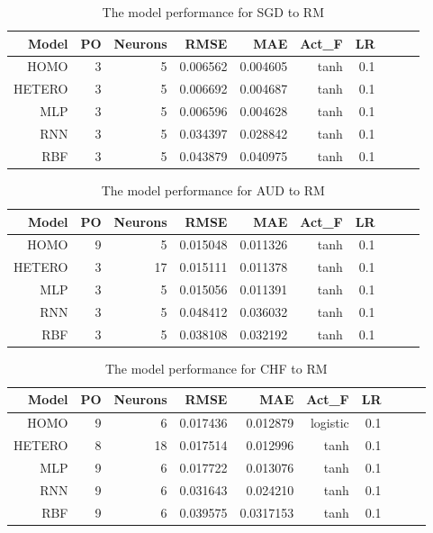 \documentclass[journal]{IEEEtran}
\begin{document}
\begin{table}[ht]
	\centering
	\begin{tabular}{@{}rrrrrrrrrr@{}}
		\toprule
		\textbf{Model} &\textbf{PO}&\textbf{Neurons}& \textbf{RMSE} & \textbf{MAE} & \textbf{Act\_F} & \textbf{LR} \\
		\midrule
		
		HOMO	&  3 & 5 & 0.006562 & 0.004605 & tanh & 0.1 \\
		HETERO	& 3 & 5 & 0.006692 & 0.004687 & tanh & 0.1  \\  
		MLP	&  3 & 5 & 0.006596 & 0.004628 & tanh & 0.1 \\	
		RNN	& 3 & 5 & 0.034397 & 0.028842 & tanh & 0.1 \\
		RBF	& 3 & 5 & 0.043879 & 0.040975 & tanh & 0.1  \\
		\hline
	\end{tabular}
	\hspace*{3cm}
	\caption{The model performance for SGD to RM }
\end{table}


\begin{table}[ht]
	\centering
	\begin{tabular}{@{}rrrrrrrrrr@{}}
		\toprule
		\textbf{Model} &\textbf{PO}&\textbf{Neurons}& \textbf{RMSE} & \textbf{MAE} & \textbf{Act\_F} & \textbf{LR} \\
		\midrule
		
			HOMO	& 9 & 5 & 0.015048 & 0.011326 & tanh & 0.1  \\ 
			HETERO	& 3 & 17 & 0.015111 & 0.011378 & tanh & 0.1  \\  
		MLP	&  3 & 5 & 0.015056 & 0.011391 & tanh & 0.1 \\	
		RNN	&  3 & 5 & 0.048412 & 0.036032 & tanh & 0.1 \\
		RBF	&  3 & 5 & 0.038108 & 0.032192 & tanh & 0.1  \\
		\hline
	\end{tabular}
	\hspace*{3cm}
	\caption{The model performance for AUD to RM }
\end{table}

	
\begin{table}[ht]
	\centering
	\begin{tabular}{@{}rrrrrrrrrr@{}}
		\toprule
		\textbf{Model} &\textbf{PO}&\textbf{Neurons}& \textbf{RMSE} & \textbf{MAE} & \textbf{Act\_F} & \textbf{LR} \\
		\midrule
		
		HOMO	& 9 & 6 & 0.017436 & 0.012879 & logistic & 0.1  \\
		HETERO	&  8 & 18 & 0.017514 & 0.012996 & tanh & 0.1 \\  
		MLP	& 9 & 6 & 0.017722 & 0.013076 & tanh & 0.1 \\	
		RNN	&  9 & 6 & 0.031643 & 0.024210 & tanh & 0.1 \\
		RBF	& 9 & 6 & 0.039575 & 0.0317153 & tanh & 0.1  \\
		\hline
	\end{tabular}
	\hspace*{3cm}
	\caption{The model performance for CHF to RM }
\end{table}
\end{document}

